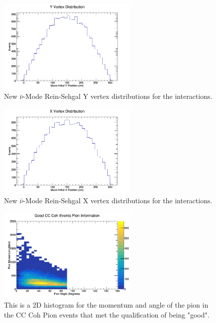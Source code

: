 \documentclass[11pt]{article}
\begin{document}
\begin{figure}[H]
\centering
\includegraphics[width=0.6\textwidth]{NewANMReinSehgalImages/3-YVertexDistributionANMRS.png}
\caption{New $\bar{\nu}$-Mode Rein-Sehgal Y vertex distributions for the interactions.}
\end{figure}

\begin{figure}[H]
\centering
\includegraphics[width=0.6\textwidth]{NewANMReinSehgalImages/4-XVertexDistributionANMRS.png}
\caption{New $\bar{\nu}$-Mode Rein-Sehgal X vertex distributions for the interactions.}
\end{figure}

\begin{figure}[H]
\centering
\includegraphics[width=0.6\textwidth]{NewANMReinSehgalImages/5-GoodCCCohPionInfoANMRS.png}
\caption{This is a 2D histogram for the momentum and angle of the pion in the CC Coh Pion events that met the qualification of being "good".}
\end{figure}
\end{document}
